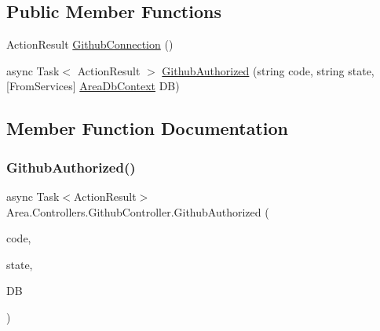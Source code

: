 \subsection*{Public Member Functions}
\begin{DoxyCompactItemize}
\item 
Action\+Result \mbox{\hyperlink{classArea_1_1Controllers_1_1GithubController_ae09ff800b4a3caa6450c7004197c5a90}{Github\+Connection}} ()
\item 
async Task$<$ Action\+Result $>$ \mbox{\hyperlink{classArea_1_1Controllers_1_1GithubController_a785ec72735634312f473455a0858e91b}{Github\+Authorized}} (string code, string state, \mbox{[}From\+Services\mbox{]} \mbox{\hyperlink{classArea_1_1DAT_1_1AreaDbContext}{Area\+Db\+Context}} DB)
\end{DoxyCompactItemize}


\subsection{Member Function Documentation}
\mbox{\label{classArea_1_1Controllers_1_1GithubController_a785ec72735634312f473455a0858e91b}} 
\subsubsection{\texorpdfstring{Github\+Authorized()}{GithubAuthorized()}}
{\footnotesize\ttfamily async Task$<$Action\+Result$>$ Area.\+Controllers.\+Github\+Controller.\+Github\+Authorized (\begin{DoxyParamCaption}\item[{string}]{code,  }\item[{string}]{state,  }\item[{\mbox{[}\+From\+Services\mbox{]} \mbox{\hyperlink{classArea_1_1DAT_1_1AreaDbContext}{Area\+Db\+Context}}}]{DB }\end{DoxyParamCaption})\hspace{0.3cm}{\ttfamily [inline]}}

\mbox{\label{classArea_1_1Controllers_1_1GithubController_ae09ff800b4a3caa6450c7004197c5a90}} 
